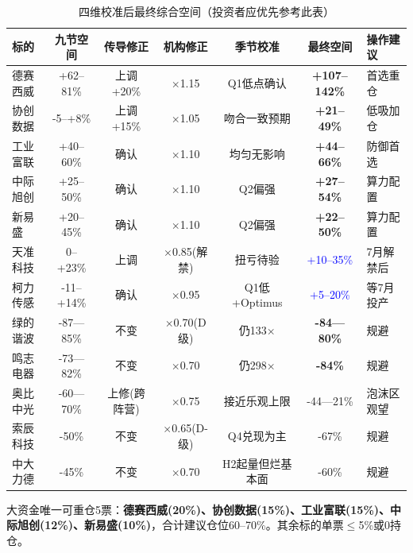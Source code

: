 \begin{table}[H]
\centering\scriptsize
\renewcommand{\arraystretch}{1.15}
\begin{tabularx}{\textwidth}{l c c c c c l}
\toprule
\textbf{标的} & \textbf{九节空间} & \textbf{传导修正} & \textbf{机构修正} & \textbf{季节校准} & \textbf{最终空间} & \textbf{操作建议} \\
\midrule
德赛西威 & +62--81\% & 上调+20\% & $\times$1.15 & Q1低点确认 & \textcolor{riskgreen}{\textbf{+107--142\%}} & 首选重仓 \\
协创数据 & -5--+8\% & 上调+15\% & $\times$1.05 & 吻合一致预期 & \textcolor{riskgreen}{\textbf{+21--49\%}} & 低吸加仓 \\
工业富联 & +40--60\% & 确认 & $\times$1.10 & 均匀无影响 & \textcolor{riskgreen}{\textbf{+44--66\%}} & 防御首选 \\
中际旭创 & +25--50\% & 确认 & $\times$1.10 & Q2偏强 & \textcolor{riskgreen}{\textbf{+27--54\%}} & 算力配置 \\
新易盛 & +20--45\% & 确认 & $\times$1.10 & Q2偏强 & \textcolor{riskgreen}{\textbf{+22--50\%}} & 算力配置 \\
天准科技 & 0--+23\% & 上调 & $\times$0.85(解禁) & 扭亏待验 & \textcolor{blue}{+10--35\%} & 7月解禁后 \\
柯力传感 & -11--+14\% & 确认 & $\times$0.95 & Q1低+Optimus & \textcolor{blue}{+5--20\%} & 等7月投产 \\
绿的谐波 & -87---85\% & 不变 & $\times$0.70(D级) & 仍133$\times$ & \textcolor{riskred}{\textbf{-84---80\%}} & 规避 \\
鸣志电器 & -73---82\% & 不变 & $\times$0.70 & 仍298$\times$ & \textcolor{riskred}{\textbf{-84\%}} & 规避 \\
奥比中光 & -60---70\% & 上修(跨阵营) & $\times$0.75 & 接近乐观上限 & \textcolor{riskred}{-44---21\%} & 泡沫区观望 \\
索辰科技 & -50\% & 不变 & $\times$0.65(D-级) & Q4兑现为主 & \textcolor{riskred}{-67\%} & 规避 \\
中大力德 & -45\% & 不变 & $\times$0.70 & H2起量但烂基本面 & \textcolor{riskred}{-60\%} & 规避 \\
\bottomrule
\end{tabularx}
\caption{四维校准后最终综合空间（投资者应优先参考此表）}
\end{table}

\begin{keyinsight}[最终结论]
大资金唯一可重仓5票：\textbf{德赛西威(20\%)、协创数据(15\%)、工业富联(15\%)、中际旭创(12\%)、新易盛(10\%)}，合计建议仓位60--70\%。其余标的单票$\leq$5\%或0持仓。
\end{keyinsight}
